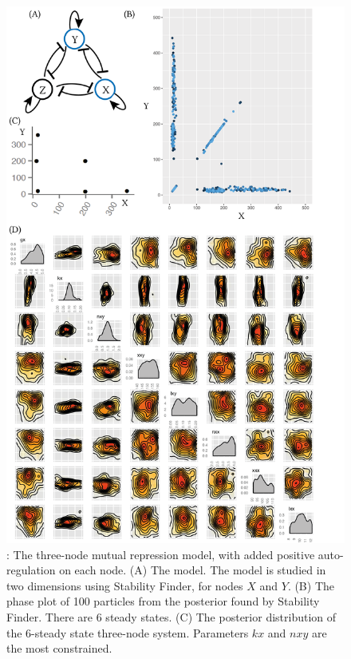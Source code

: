 \begin{figure}[h]
\begin{center}
\includegraphics[scale=0.6]{../../chapters/chapterStabilityFinder/images/lu_6ss.png}
\caption[The three-node mutual repression model, with added positive auto-regulation on each node.]{ \label{fig:fig8}: The three-node mutual repression model, with added positive auto-regulation on each node. (A) The model. The model is studied in two dimensions using Stability Finder, for nodes $X$ and $Y$. (B) The phase plot of 100 particles from the posterior found by Stability Finder. There are 6 steady states. (C) The posterior distribution of the 6-steady state three-node system. Parameters $kx$ and $nxy$ are the most constrained.}
\end{center}
\end{figure}
\clearpage

